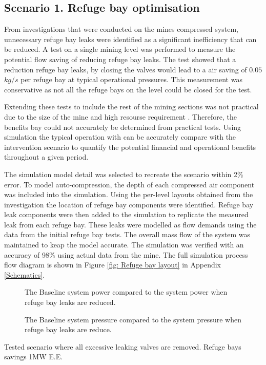 	\subsection{Scenario 1. Refuge bay optimisation}
	From investigations that were conducted on the mines compressed system, unnecessary refuge bay leaks were identified as a significant inefficiency that can be reduced. A test on a single mining level was performed to  measure the potential flow saving of reducing refuge bay leaks. The test showed that a reduction refuge bay leaks, by closing the valves would lead to a air saving of $0.05$ $kg/s$ per refuge bay at typical operational pressures. This measurement was conservative as not all the refuge bays on the level could be closed for the test. 
	\par 
	Extending these tests to include the rest of the mining sections was not practical due to the size of the mine and high resourse requirement . Therefore, the benefits bay could not accurately be determined from practical tests. Using simulation the typical operation with can be accurately compare with the intervention scenario to quantify the potential financial and operational benefits throughout a given period.
	\par
	The simulation model detail was selected to recreate the scenario within 2\% error. To model auto-compression, the depth of each compressed air component was included into the simulation. Using the per-level layouts obtained from the investigation the location of refuge bay components were identified. Refuge bay leak components were then added to the simulation to replicate the measured leak from each refuge bay. These leaks were modelled as flow demands using the data from the initial refuge bay tests. The overall mass flow of the system was maintained to keap the model accurate. The simulation was verified with an accuracy of 98\% using actual data from the mine. The full simulation process flow diagram is shown in Figure \ref{fig: Refuge bay layout} in Appendix \ref{Schematics}.
	\par 
	
	\begin{figure}[h]
		\centering
		
		\caption{The Baseline system power compared to the system power when refuge bay leaks are reduced.}
		\label{fig: RefugeBay Power.}
	\end{figure}   

	\begin{figure}[h]
		\centering
		
		\caption{The Baseline system pressure compared to the system pressure when refuge bay leaks are reduce.}
		\label{fig: RefugeBay Pressures.}
	\end{figure}  
	Tested scenario where all excessive leaking valves are removed.
	Refuge bays savings 1MW E.E.
	
